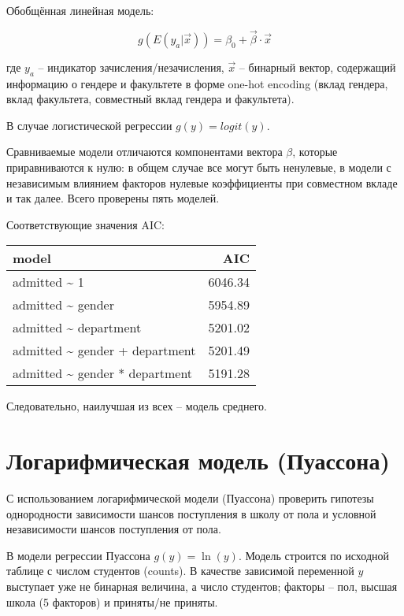 \documentclass[a4paper,12pt]{article}
\begin{document}
Обобщённая линейная модель:

\[ g(E(y_a|\vec x)) = \beta_0 + \vec \beta \cdot \vec x \]

где $ y_a $ -- индикатор зачисления/незачисления, $ \vec x $ -- бинарный вектор, содержащий информацию о гендере и факультете в форме one-hot encoding (вклад гендера, вклад факультета, совместный вклад гендера и факультета).

В случае логистической регрессии $ g(y) = logit(y) $.

Сравниваемые модели отличаются компонентами вектора $ \beta $, которые приравниваются к нулю: в общем случае все могут быть ненулевые, в модели с независимым влиянием факторов нулевые коэффициенты при совместном вкладе и так далее.
Всего проверены пять моделей.

Соответствующие значения AIC:

\begin{table}[ht]
    \centering
    \begin{tabular}{lr}
        \hline
        model & AIC \\
        \hline
        admitted \~{} 1 & 6046.34 \\
        admitted \~{} gender & 5954.89 \\
        admitted \~{} department & 5201.02 \\
        admitted \~{} gender + department & 5201.49 \\
        admitted \~{} gender * department & 5191.28 \\
        \hline
    \end{tabular}
\end{table}

Следовательно, наилучшая из всех -- модель среднего.

\section{Логарифмическая модель (Пуассона)}
\label{section:poisson}

\begin{leftbar}
    С использованием логарифмической модели (Пуассона) проверить гипотезы однородности зависимости шансов поступления в школу от пола и условной независимости шансов поступления от пола.
\end{leftbar}

В модели регрессии Пуассона $ g(y) = \ln(y) $.
Модель строится по исходной таблице с числом студентов (counts).
В качестве зависимой переменной $y$ выступает уже не бинарная величина, а число студентов; факторы -- пол, высшая школа (5 факторов) и приняты/не приняты.
\end{document}

